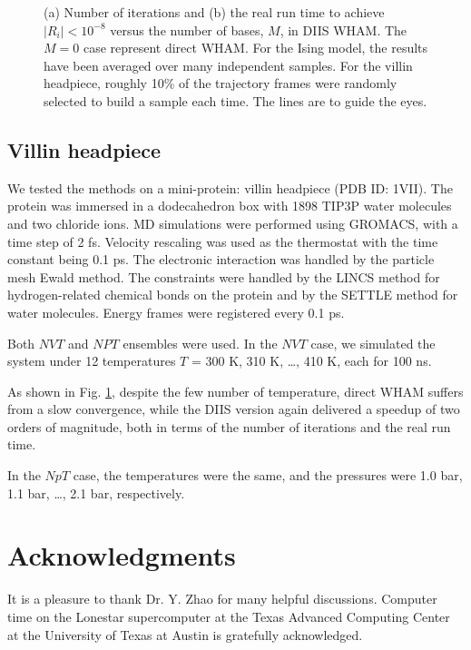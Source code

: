 \documentclass[reprint,superscriptaddress]{revtex4-1}
\begin{document}
\begin{figure}[h]
  \caption{
    \label{fig:nsnt}
    (a) Number of iterations
    and
    (b) the real run time 
    to achieve $|R_i| < 10^{-8}$
    versus the number of bases, $M$,
    in DIIS WHAM.
    The $M = 0$ case represent direct WHAM.
    For the Ising model,
    the results have been averaged over many independent samples.
    For the villin headpiece,
    roughly 10\% of the trajectory frames
    were randomly selected to build a sample each time.
    The lines are to guide the eyes.
  }
\end{figure}




\subsection{Villin headpiece}



We tested the methods on a mini-protein:
villin headpiece\cite{duan1998}
(PDB ID: 1VII).
%
The protein was immersed in
a dodecahedron box with 1898 TIP3P water molecules and two chloride ions.
%
MD simulations were performed
using GROMACS\cite{
berendsen1995, *lindahl2001, *vanderspoel2005, *hess2008},
with a time step of 2 fs.
%
Velocity rescaling\cite{bussi2007}
was used as the thermostat with
the time constant being 0.1 ps.
%
The electronic interaction was
handled by the particle mesh Ewald method\cite{
essmann1995}.
%
The constraints were handled by the LINCS method\cite{
hess1997}
for hydrogen-related chemical bonds on the protein
and by the SETTLE method\cite{
miyamoto1992}
for water molecules.
%
Energy frames were registered every 0.1 ps.



Both $NVT$ and $NPT$ ensembles were used.
%
In the $NVT$ case,
we simulated the system under 12 temperatures
$T$ = 300 K, 310 K, \dots, 410 K,
each for {\color{red} 100} ns.



As shown in Fig. \ref{fig:nsnt},
despite the few number of temperature,
direct WHAM suffers from a slow convergence,
while the DIIS version again
delivered a speedup of two orders of magnitude,
both in terms of the number of iterations
and the real run time.



In the $NpT$ case,
the temperatures were the same,
and the pressures were
1.0 bar, 1.1 bar, \dots, 2.1 bar,
respectively.





\section{Acknowledgments}





It is a pleasure to thank Dr. Y. Zhao
for many helpful discussions.
%
Computer time on the Lonestar supercomputer
at the Texas Advanced Computing Center
at the University of Texas at Austin
is gratefully acknowledged.




\end{document}
